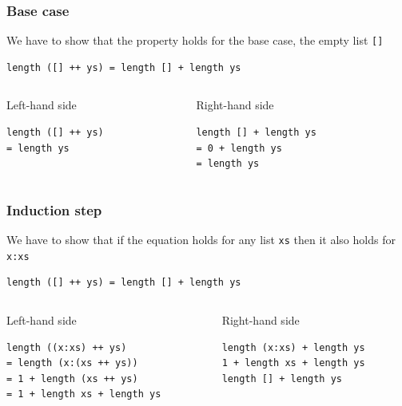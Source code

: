 \documentclass{beamer}
\begin{document}
\begin{frame}[fragile]
\frametitle{Base case}
We have to show that the property holds for the base case, the empty list \verb|[]|
\begin{verbatim}
length ([] ++ ys) = length [] + length ys
\end{verbatim}
\begin{columns}
  \begin{column}{.5\textwidth}
    \begin{block}{Left-hand side}
      \begin{verbatim}
length ([] ++ ys)
= length ys
\end{verbatim}
    \end{block}
  \end{column}
  \begin{column}{.5\textwidth}
    \begin{block}{Right-hand side}
\begin{verbatim}
length [] + length ys   
= 0 + length ys
= length ys
\end{verbatim}
    \end{block}
  \end{column}
\end{columns}
\end{frame}



\begin{frame}[fragile]
\frametitle{Induction step}
We have to show that if the equation holds for any list \verb|xs| then it also holds for \verb|x:xs|
\begin{verbatim}
length ([] ++ ys) = length [] + length ys
\end{verbatim}
\begin{columns}
  \begin{column}{.5\textwidth}
    \begin{block}{Left-hand side}
      \begin{verbatim}
length ((x:xs) ++ ys)      
= length (x:(xs ++ ys))    
= 1 + length (xs ++ ys)    
= 1 + length xs + length ys
\end{verbatim}
    \end{block}
  \end{column}
  \begin{column}{.5\textwidth}
    \begin{block}{Right-hand side}
\begin{verbatim}
length (x:xs) + length ys
1 + length xs + length ys
length [] + length ys   
\end{verbatim}
    \end{block}
  \end{column}
\end{columns}

\end{frame}
\end{document}

